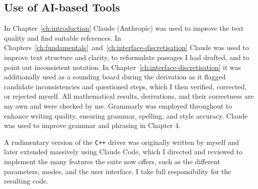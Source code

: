 \subsection*{Use of AI-based Tools}
In Chapter~\ref{ch:introduction} Claude (Anthropic) was used to improve the text quality and find suitable references.
In Chapters~\ref{ch:fundamentals}~and~\ref{ch:interface-discretisation} Claude was used to improve text structure and clarity, to reformulate passages I had drafted, and to point out inconsistent notation. In Chapter~\ref{ch:interface-discretisation} it was additionally used as a sounding board during the derivation as it flagged candidate inconsistencies and questioned steps, which I then verified, corrected, or rejected myself. All mathematical results, derivations, and their correctness are my own and were checked by me.
Grammarly was employed throughout to enhance writing quality, ensuring grammar, spelling, and style accuracy.
Claude was used to improve grammar and phrasing in Chapter 4.

A rudimentary version of the \texttt{C++} driver was originally written by myself and later extended massively using Claude Code, which I directed and reviewed to implement the many features the suite now offers, such as the different parameters, modes, and the user interface. I take full responsibility for the resulting code.